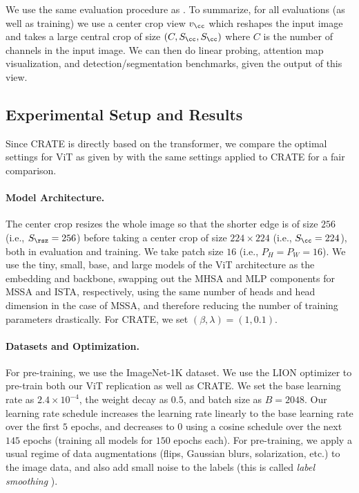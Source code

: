 \documentclass[../../book-main.tex]{subfiles}
\begin{document}
We use the same evaluation procedure as
. To summarize, for all
evaluations (as well as training) we use a center crop view
\(v_{\cc}\) which reshapes the input image and takes a large central
crop of size \((C, S_{\cc}, S_{\cc})\) where \(C\) is the number of
channels in the input image. We can then do linear probing, attention
map visualization, and detection/segmentation benchmarks, given the
output of this view.

\subsection{Experimental Setup and
Results}\label{sub:image_classification_experiments}

Since CRATE is directly based on the transformer, we compare the
optimal settings for ViT as given by
\cite{dosovitskiy2020image,touvron2020training} with the same
settings applied to CRATE for a fair comparison.

\paragraph{Model Architecture.} The center crop resizes the whole
image so that the shorter edge is of size \(256\) (i.e., \(S_{\rsz} =
256\)) before taking a center crop of size \(224 \times 224\) (i.e.,
\(S_{\cc} = 224\)), both in evaluation and training. We take patch
size \(16\) (i.e., \(P_{H} = P_{W} = 16\)). We use the tiny, small,
base, and large models of the ViT \cite{dosovitskiy2020image}
architecture as the embedding and backbone, swapping out the MHSA and
MLP components for MSSA and ISTA, respectively, using the same number
of heads and head dimension in the case of MSSA, and therefore
reducing the number of training parameters drastically. For CRATE, we
set \((\beta, \lambda) = (1, 0.1)\).

\paragraph{Datasets and Optimization.} For pre-training, we use the
ImageNet-1K dataset. We use the LION optimizer
\citep{chen2024symbolic} to pre-train both our ViT replication as
well as CRATE. We set the base learning rate as \(2.4 \times
10^{-4}\), the weight decay as \(0.5\), and batch size as \(B =
2048\). Our learning rate schedule increases the learning rate
linearly to the base learning rate over the first \(5\) epochs, and
decreases to \(0\) using a cosine schedule over the next \(145\)
epochs (training all models for \(150\) epochs each). For
pre-training, we apply a usual regime of data augmentations (flips,
Gaussian blurs, solarization, etc.) to the image data, and also add
small noise to the labels (this is called \textit{label smoothing}
\citep{muller2019does}).
\end{document}
